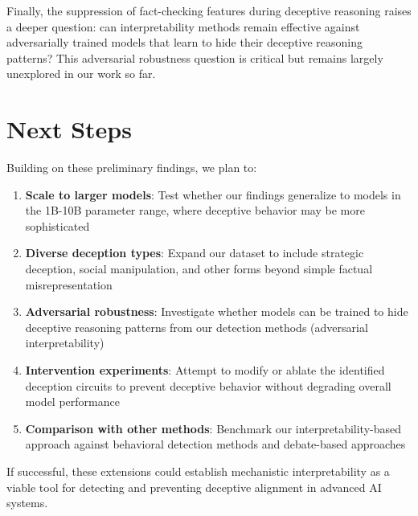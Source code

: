 \documentclass[midterm]{sparreport}
\begin{document}
Finally, the suppression of fact-checking features during deceptive reasoning raises a deeper question: can interpretability methods remain effective against adversarially trained models that learn to hide their deceptive reasoning patterns? This adversarial robustness question is critical but remains largely unexplored in our work so far.

\section{Next Steps}

Building on these preliminary findings, we plan to:

\begin{enumerate}
  \item \textbf{Scale to larger models}: Test whether our findings generalize to models in the 1B-10B parameter range, where deceptive behavior may be more sophisticated

  \item \textbf{Diverse deception types}: Expand our dataset to include strategic deception, social manipulation, and other forms beyond simple factual misrepresentation

  \item \textbf{Adversarial robustness}: Investigate whether models can be trained to hide deceptive reasoning patterns from our detection methods (adversarial interpretability)

  \item \textbf{Intervention experiments}: Attempt to modify or ablate the identified deception circuits to prevent deceptive behavior without degrading overall model performance

  \item \textbf{Comparison with other methods}: Benchmark our interpretability-based approach against behavioral detection methods and debate-based approaches~\cite{irving2018ai}
\end{enumerate}

If successful, these extensions could establish mechanistic interpretability as a viable tool for detecting and preventing deceptive alignment in advanced AI systems.



\end{document}
